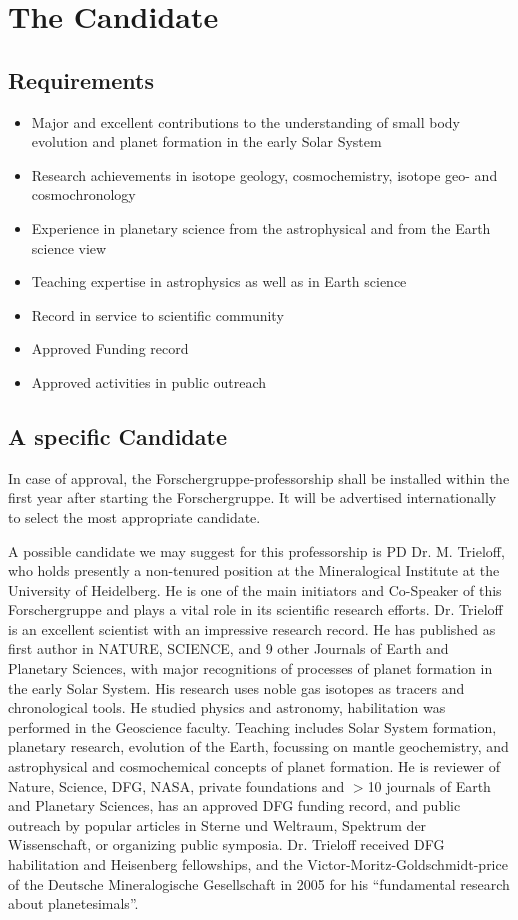 \section{The Candidate}
%
\subsection{Requirements}
%
\begin{itemize}
%
\item
Major and excellent contributions to the understanding of small body
evolution and planet formation in the early Solar System
%
\item
Research achievements in isotope geology, cosmochemistry, isotope geo- and cosmochronology
%
\item
Experience in planetary science from the astrophysical and from the Earth science view 
%
\item
Teaching expertise in astrophysics as well as in Earth science
%
\item
Record in service to scientific community
%
\item
Approved Funding record
%
\item
Approved activities in public outreach
\end{itemize}
%
\subsection{A specific Candidate}
%
In case of approval, the Forschergruppe-professorship shall be installed within the
first year after starting the Forschergruppe. It will be advertised internationally
to select the most appropriate candidate. 

A possible candidate we may suggest for this
professorship is PD Dr. M. Trieloff, who holds presently a non-tenured position
at the Mineralogical Institute at the University of Heidelberg. 
He is one of the main initiators and Co-Speaker of this Forschergruppe
and plays a vital role in its scientific research efforts.
Dr. Trieloff is an excellent scientist with an impressive research record. 
He has published as first author
in NATURE, SCIENCE, and 9 other Journals of Earth and Planetary Sciences, with
major recognitions of processes of planet formation in the early Solar System.
His research uses noble gas isotopes as tracers and chronological tools.
He studied physics and astronomy, habilitation was performed in the Geoscience
faculty. Teaching includes Solar System formation, planetary research, evolution
of the Earth, focussing on mantle geochemistry, and astrophysical and cosmochemical
concepts of planet formation. He is reviewer of Nature, Science, DFG, NASA,
private foundations and $>$10 journals of Earth and Planetary Sciences,
has an approved DFG funding record, and public outreach by popular articles
in Sterne und Weltraum, Spektrum der Wissenschaft, or organizing public symposia.
Dr. Trieloff received DFG habilitation and Heisenberg fellowships, and
the Victor-Moritz-Goldschmidt-price of the Deutsche Mineralogische Gesellschaft
in 2005 for his ``fundamental research about planetesimals''.

